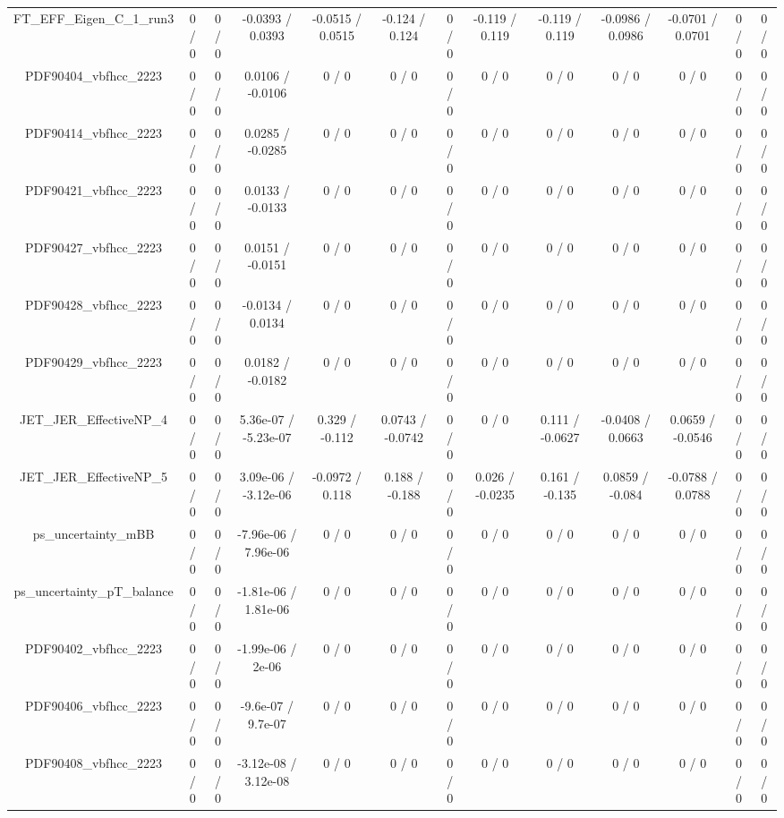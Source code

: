 \documentclass[10pt]{article}
\begin{document}
\begin{table}[htbp]
\begin{center}
\begin{tabular}{|c|c|c|c|c|c|c|c|c|c|c|c|c|}
  FT_EFF_Eigen_C_1_run3 & 0 / 0 & 0 / 0 & -0.0393 / 0.0393 & -0.0515 / 0.0515 & -0.124 / 0.124 & 0 / 0 & -0.119 / 0.119 & -0.119 / 0.119 & -0.0986 / 0.0986 & -0.0701 / 0.0701 & 0 / 0 & 0 / 0 \\ 
  PDF90404_vbfhcc_2223 & 0 / 0 & 0 / 0 & 0.0106 / -0.0106 & 0 / 0 & 0 / 0 & 0 / 0 & 0 / 0 & 0 / 0 & 0 / 0 & 0 / 0 & 0 / 0 & 0 / 0 \\ 
  PDF90414_vbfhcc_2223 & 0 / 0 & 0 / 0 & 0.0285 / -0.0285 & 0 / 0 & 0 / 0 & 0 / 0 & 0 / 0 & 0 / 0 & 0 / 0 & 0 / 0 & 0 / 0 & 0 / 0 \\ 
  PDF90421_vbfhcc_2223 & 0 / 0 & 0 / 0 & 0.0133 / -0.0133 & 0 / 0 & 0 / 0 & 0 / 0 & 0 / 0 & 0 / 0 & 0 / 0 & 0 / 0 & 0 / 0 & 0 / 0 \\ 
  PDF90427_vbfhcc_2223 & 0 / 0 & 0 / 0 & 0.0151 / -0.0151 & 0 / 0 & 0 / 0 & 0 / 0 & 0 / 0 & 0 / 0 & 0 / 0 & 0 / 0 & 0 / 0 & 0 / 0 \\ 
  PDF90428_vbfhcc_2223 & 0 / 0 & 0 / 0 & -0.0134 / 0.0134 & 0 / 0 & 0 / 0 & 0 / 0 & 0 / 0 & 0 / 0 & 0 / 0 & 0 / 0 & 0 / 0 & 0 / 0 \\ 
  PDF90429_vbfhcc_2223 & 0 / 0 & 0 / 0 & 0.0182 / -0.0182 & 0 / 0 & 0 / 0 & 0 / 0 & 0 / 0 & 0 / 0 & 0 / 0 & 0 / 0 & 0 / 0 & 0 / 0 \\ 
  JET_JER_EffectiveNP_4 & 0 / 0 & 0 / 0 & 5.36e-07 / -5.23e-07 & 0.329 / -0.112 & 0.0743 / -0.0742 & 0 / 0 & 0 / 0 & 0.111 / -0.0627 & -0.0408 / 0.0663 & 0.0659 / -0.0546 & 0 / 0 & 0 / 0 \\ 
  JET_JER_EffectiveNP_5 & 0 / 0 & 0 / 0 & 3.09e-06 / -3.12e-06 & -0.0972 / 0.118 & 0.188 / -0.188 & 0 / 0 & 0.026 / -0.0235 & 0.161 / -0.135 & 0.0859 / -0.084 & -0.0788 / 0.0788 & 0 / 0 & 0 / 0 \\ 
  ps_uncertainty_mBB & 0 / 0 & 0 / 0 & -7.96e-06 / 7.96e-06 & 0 / 0 & 0 / 0 & 0 / 0 & 0 / 0 & 0 / 0 & 0 / 0 & 0 / 0 & 0 / 0 & 0 / 0 \\ 
  ps_uncertainty_pT_balance & 0 / 0 & 0 / 0 & -1.81e-06 / 1.81e-06 & 0 / 0 & 0 / 0 & 0 / 0 & 0 / 0 & 0 / 0 & 0 / 0 & 0 / 0 & 0 / 0 & 0 / 0 \\ 
  PDF90402_vbfhcc_2223 & 0 / 0 & 0 / 0 & -1.99e-06 / 2e-06 & 0 / 0 & 0 / 0 & 0 / 0 & 0 / 0 & 0 / 0 & 0 / 0 & 0 / 0 & 0 / 0 & 0 / 0 \\ 
  PDF90406_vbfhcc_2223 & 0 / 0 & 0 / 0 & -9.6e-07 / 9.7e-07 & 0 / 0 & 0 / 0 & 0 / 0 & 0 / 0 & 0 / 0 & 0 / 0 & 0 / 0 & 0 / 0 & 0 / 0 \\ 
  PDF90408_vbfhcc_2223 & 0 / 0 & 0 / 0 & -3.12e-08 / 3.12e-08 & 0 / 0 & 0 / 0 & 0 / 0 & 0 / 0 & 0 / 0 & 0 / 0 & 0 / 0 & 0 / 0 & 0 / 0 \\ 

\end{tabular}
\end{center}
\end{table}
\end{document}
